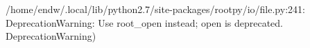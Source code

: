 \begin{footnotesize}
\begin{pyglist}[language=text,texcl=true,abovecaptionskip=0,style=bw]
/home/endw/.local/lib/python2.7/site-packages/rootpy/io/file.py:241: DeprecationWarning: Use root_open instead; open is deprecated.
  DeprecationWarning)
\end{pyglist}
\end{footnotesize}
